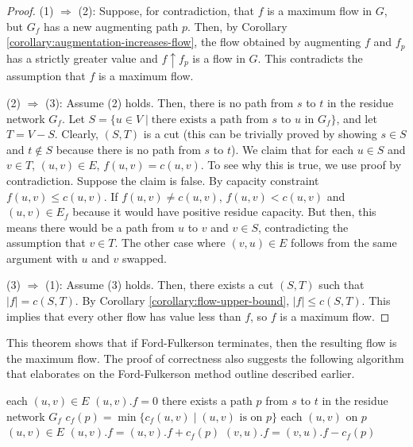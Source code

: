 \begin{proof}
    \hfill

    (1) $\Rightarrow$ (2): Suppose, for contradiction, that $f$ is a maximum flow in $G$, but $G_f$ has a new augmenting path $p$. Then, by Corollary \ref{corollary:augmentation-increases-flow}, the flow obtained by augmenting $f$ and $f_p$ has a strictly greater value and $f \uparrow f_p$ is a flow in $G$. This contradicts the assumption that $f$ is a maximum flow. 

    (2) $\Rightarrow$ (3): Assume (2) holds. Then, there is no path from $s$ to $t$ in the residue network $G_f$. Let $S = \{ u \in V \mid \text{there exists a path from $s$ to $u$ in $G_f$} \}$, and let $T = V-S$. Clearly, $(S,T)$ is a cut (this can be trivially proved by showing $s \in S$ and $t \not\in S$ because there is no path from $s$ to $t$). We claim that for each $u\in S$ and $v \in T$, $(u,v) \in E$, $f(u,v) = c(u,v)$. To see why this is true, we use proof by contradiction. Suppose the claim is false. By capacity constraint $f(u,v) \leq c(u,v)$. If $f(u,v) \neq c(u,v)$, $f(u,v) < c(u,v)$ and $(u,v) \in E_f$ because it would have positive residue capacity. But then, this means there would be a path from $u$ to $v$ and $v \in S$, contradicting the assumption that $v \in T$. The other case where $(v,u) \in E$ follows from the same argument with $u$ and $v$ swapped.

    (3) $\Rightarrow$ (1): Assume (3) holds. Then, there exists a cut $(S,T)$ such that $|f| = c(S,T)$. By Corollary \ref{corollary:flow-upper-bound}, $|f| \leq c(S,T)$. This implies that every other flow has value less than $f$, so $f$ is a maximum flow.
\end{proof}

This theorem shows that if Ford-Fulkerson terminates, then the resulting flow is the maximum flow. The proof of correctness also suggests the following algorithm that elaborates on the Ford-Fulkerson method outline described earlier.

\begin{codebox}
    \li \For each $(u,v) \in E$ \Do
        \li $(u,v).f = 0$ 
    \End
    \li \While there exists a path $p$ from $s$ to $t$ in the residue network $G_f$ \Do
        \li $c_f(p) = \min \{c_f(u,v) \mid \text{$(u,v)$ is on $p$} \}$ 
        \li \For each $(u,v)$ on $p$ \Do {}
            \li \If $(u,v) \in E$ \Then
                \li $(u,v).f = (u,v).f + c_f(p)$
            \li \Else $(v,u).f = (v,u).f - c_f(p)$
            \End
        \End
    \End
\end{codebox}

